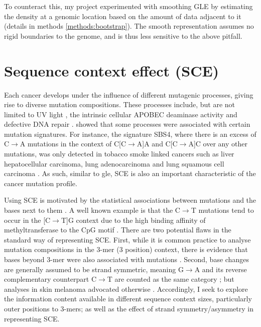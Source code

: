 To counteract this, my project experimented with smoothing GLE by estimating the \gls{density} at a genomic location based on the amount of data adjacent to it (details in methods \ref{methods:bootstrap}). The smooth representation assumes no rigid boundaries to the genome, and is thus less sensitive to the above pitfall. 



\section{Sequence context effect (SCE)}
\label{intro:sce}

Each cancer develops under the influence of different mutagenic processes, giving rise to diverse mutation compositions. These processes include, but are not limited to UV light \citep[known to drive skin melanoma;][]{Mohania2017}, the intrinsic cellular APOBEC deaminase activity \citep[\textit{e.g.} in B cells;][]{Kuppers2005MechanismsPathogenesis} and defective DNA repair \citep[\textit{e.g.} mutated \textit{BRCA} genes in breast cancer;][]{Navasardyan2021YY1TNBC}. \citet{Alexandrov2013, Alexandrov2020} showed that some processes were associated with certain mutation signatures. For instance, the signature SBS4, where there is an excess of C$\rightarrow$A mutations in the context of C[C$\rightarrow$A]A and C[C$\rightarrow$A]C over any other mutations, was only detected in tobacco smoke linked cancers such as liver hepatocellular carcinoma, lung adenocarcinoma and lung squamous cell carcinoma \citep{Alexandrov2020}. As such, similar to \gls{gle}, SCE is also an important characteristic of the cancer mutation profile. 

Using SCE is motivated by the statistical associations between mutations and the \glspl{base} next to them \citep{Zhu2017}. A well known example is that the C$\rightarrow$T mutations tend to occur in the [C$\rightarrow$T]G context due to the high binding affinity of methyltransferase to the CpG motif \citep[Figure \ref{fig:motif_demo}][]{Cooper2010}. There are two potential flaws in the standard way of representing SCE. First, while it is common practice to analyse mutation compositions in the 3-mer (3 position) context, there is evidence that bases beyond 3-mer were also associated with mutations \citep{Zhu2017,Zhu2020}. Second, base changes are generally assumed to be strand symmetric, meaning G$\rightarrow$A and its reverse complementary counterpart C$\rightarrow$T are counted as the same category \citep[Figure \ref{fig:motif_symmetric_demo};][]{Alexandrov2013, Jiao2020}; but analyses in skin melanoma advocated otherwise \citep{Zhu2017}. Accordingly, I seek to explore the information content available in different sequence context sizes, particularly outer positions to 3-mers; as well as the effect of strand symmetry/asymmetry in representing SCE.

